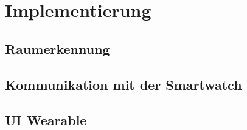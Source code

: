 \section{Implementierung}

\subsection{Raumerkennung}

\subsection{Kommunikation mit der Smartwatch}

\subsection{UI Wearable}